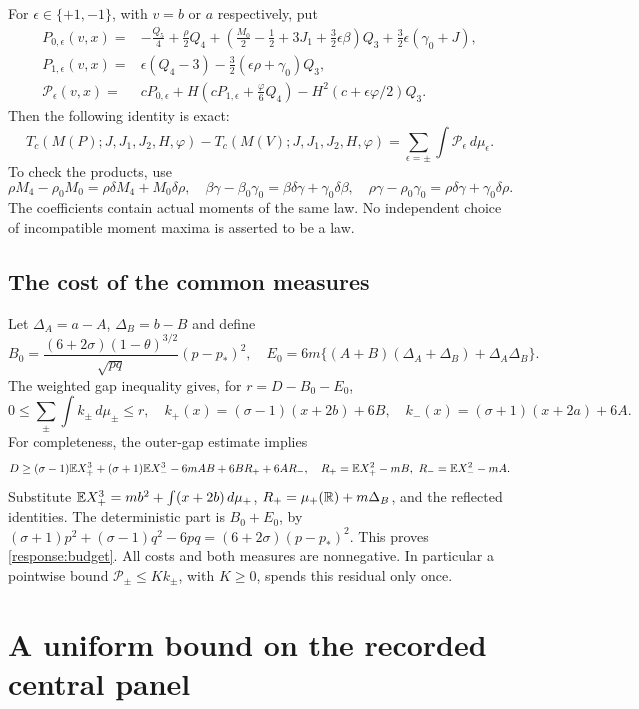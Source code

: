 For $\epsilon\in\{+1,-1\}$, with $v=b$ or $a$ respectively, put
\begin{align*}
 P_{0,\epsilon}(v,x)
 ={}&-\frac{Q_5}{4}+\frac\rho2Q_4
 +\left(\frac{M_0}{2}-\frac12+3J_1+\frac32\epsilon\beta\right)Q_3
 +\frac32\epsilon(\gamma_0+J),\\
 P_{1,\epsilon}(v,x)
 ={}&\epsilon(Q_4-3)-\frac32(\epsilon\rho+\gamma_0)Q_3,\\
 \mathscr P_\epsilon(v,x)
 ={}&cP_{0,\epsilon}
 +H\left(cP_{1,\epsilon}+\frac\varphi6Q_4\right)
 -H^2(c+\epsilon\varphi/2)Q_3.
\end{align*}
Then the following identity is exact:
\begin{equation}\label{response:exact}
 T_c(M(P);J,J_1,J_2,H,\varphi)-T_c(M(V);J,J_1,J_2,H,\varphi)
 =\sum_{\epsilon=\pm}\int\mathscr P_\epsilon\,d\mu_\epsilon.
\end{equation}
To check the products, use
\[
 \rho M_4-\rho_0M_0=\rho\delta M_4+M_0\delta\rho,
 \quad\beta\gamma-\beta_0\gamma_0=\beta\delta\gamma+\gamma_0\delta\beta,
 \quad\rho\gamma-\rho_0\gamma_0=\rho\delta\gamma+\gamma_0\delta\rho.
\]
The coefficients contain actual moments of the same law. No independent
choice of incompatible moment maxima is asserted to be a law.

\subsection{The cost of the common measures}
Let $\Delta_A=a-A$, $\Delta_B=b-B$ and define
\[
 B_0=\frac{(6+2\sigma)(1-\theta)^{3/2}}{\sqrt{pq}}(p-p_*)^2,
 \quad E_0=6m\{(A+B)(\Delta_A+\Delta_B)+\Delta_A\Delta_B\}.
\]
The weighted gap inequality gives, for $r=D-B_0-E_0$,
\begin{equation}\label{response:budget}
 0\le\sum_\pm\int k_\pm\,d\mu_\pm\le r,
 \quad
 k_+(x)=(\sigma-1)(x+2b)+6B,
 \quad k_-(x)=(\sigma+1)(x+2a)+6A.
\end{equation}
For completeness, the outer-gap estimate implies
\[
 D\ge(\sigma-1)\mathbb E X_+^3+(\sigma+1)\mathbb E X_-^3
       -6mAB+6BR_++6AR_- ,\quad
 R_+=\mathbb E X_+^2-mB,\ R_-=\mathbb E X_-^2-mA.
\]
Substitute
$\mathbb E X_+^3=mb^2+\int(x+2b)\,d\mu_+$,
$R_+=\mu_+(\mathbb R)+m\Delta_B$, and the reflected identities.
The deterministic part is $B_0+E_0$, by
$(\sigma+1)p^2+(\sigma-1)q^2-6pq=(6+2\sigma)(p-p_*)^2$.
This proves \eqref{response:budget}. All costs and both measures are
nonnegative. In particular a pointwise bound
$\mathscr P_\pm\le Kk_\pm$, with $K\ge0$, spends this residual only once.

\section{A uniform bound on the recorded central panel}

